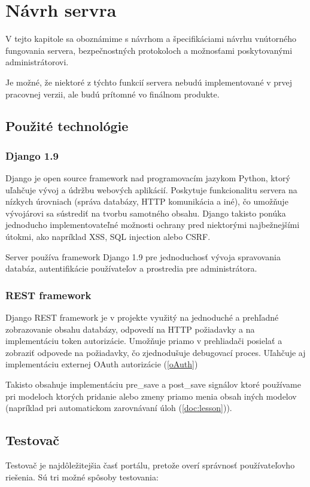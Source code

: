 \chapter{Návrh servra}

\label{kap:server}

V tejto kapitole sa oboznámime s návrhom a špecifikáciami návrhu vnútorného fungovania servera,
bezpečnostných protokoloch a možnosťami poskytovanými administrátorovi.

Je možné, že niektoré z týchto funkcií servera nebudú implementované v prvej pracovnej verzii,
ale budú prítomné vo finálnom produkte.

\section{Použité technológie}

\subsection{Django 1.9}
Django je open source framework nad programovacím jazykom Python, ktorý uľahčuje vývoj a údržbu webových aplikácií.
Poskytuje funkcionalitu servera na nízkych úrovniach (správa databázy, HTTP komunikácia a iné), čo umožňuje vývojárovi sa sústrediť na tvorbu samotného obsahu.
Django takisto ponúka jednoducho implementovateľné možnosti ochrany pred niektorými najbežnejšími útokmi, ako napríklad XSS, SQL injection alebo CSRF.
\cite{Django}

Server používa framework Django 1.9 pre jednoduchosť vývoja spravovania databáz, autentifikácie používateľov a prostredia pre administrátora.
\subsection{REST framework}
Django REST framework je v projekte využitý na jednoduché a prehľadné zobrazovanie obsahu databázy, odpovedí na HTTP požiadavky a na implementáciu
token autorizácie. Umožňuje priamo v prehliadači posielať a zobraziť odpovede na požiadavky, čo zjednodušuje debugovací proces.
Uľahčuje aj implementáciu externej OAuth autorizácie (\ref{oAuth})

Takisto obsahuje implementáciu pre\_save a post\_save signálov ktoré používame pri
modeloch ktorých pridanie alebo zmeny priamo menia obsah iných modelov \cite{rest}
(napríklad pri automatickom zarovnávaní úloh (\ref{doc:lesson})).
\section{Testovač}
\label{testovace}
Testovač je najdôležitejšia časť portálu, pretože overí správnosť používateľovho riešenia. Sú tri možné spôsoby testovania:
